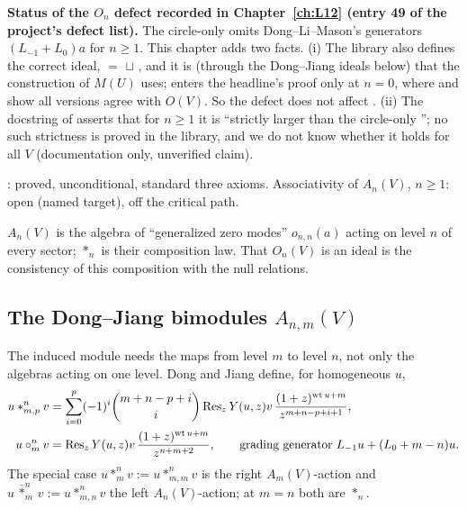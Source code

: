 \begin{warning}
\textbf{Status of the $O_n$ defect recorded in Chapter~\ref{ch:L12} (entry 49 of the project's defect list).} The circle-only
 omits Dong--Li--Mason's generators $(L_{-1}+L_0)a$ for $n\ge1$. This chapter adds two facts. (i) The library also
defines the correct ideal,  $=$  $\sqcup$ , and it is  (through the Dong--Jiang
ideals below) that the construction of $M(U)$ uses;  enters the headline's proof only at $n = 0$, where
 and  show all versions agree with $O(V)$. So the defect does not affect
. (ii) The docstring of  asserts that for $n\ge1$ it is ``strictly larger than the circle-only
''; no such strictness is proved in the library, and we do not know whether it holds for all $V$ (documentation only, unverified
claim).
\end{warning}

\begin{status}
: proved, unconditional, standard three axioms. Associativity of $A_n(V)$, $n\ge1$: open (named
target), off the critical path.
\end{status}

\begin{physics}
$A_n(V)$ is the algebra of ``generalized zero modes'' $o_{n,n}(a)$ acting on level $n$ of every sector; $*_n$ is their
composition law. That $O_n(V)$ is an ideal is the consistency of this composition with the null relations.
\end{physics}

\subsection{The Dong--Jiang bimodules \texorpdfstring{$A_{n,m}(V)$}{A\_\{n,m\}(V)}}

The induced module needs the maps from level $m$ to level $n$, not only the algebras acting on one level. Dong and Jiang
define, for homogeneous $u$,
\begin{align}
 u*^n_{m,p}v &= \sum_{i=0}^{p}(-1)^i\binom{m+n-p+i}{i}\operatorname{Res}_zY(u,z)v\,\frac{(1+z)^{\operatorname{wt} u+m}}{z^{m+n-p+i+1}},\label{l13:eq:djprod}\\
 u\circ^n_mv &= \operatorname{Res}_zY(u,z)v\,\frac{(1+z)^{\operatorname{wt} u+m}}{z^{n+m+2}},\qquad
 \text{grading generator } L_{-1}u+(L_0+m-n)u.\notag
\end{align}
The special case $u*^n_mv := u*^n_{m,m}v$ is the right $A_m(V)$-action and $u\,\bar*^n_m\,v := u*^n_{m,n}v$ the left $A_n(V)$-action;
at $m = n$ both are $*_n$.

